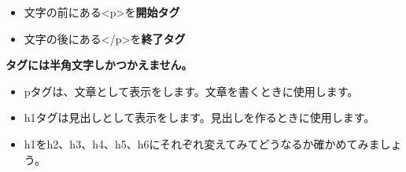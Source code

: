\documentclass[a4paper,12pt]{jarticle}
\begin{document}
\begin{itemize}
  \item 文字の前にある{\textless}p{\textgreater}を\textbf{開始タグ}
  \item 文字の後にある{\textless}/p{\textgreater}を\textbf{終了タグ}
\end{itemize}

\textbf{タグには半角文字しかつかえません。}

\begin{itemize}
  \item pタグは、文章として表示をします。文章を書くときに使用します。

  \item h1タグは見出しとして表示をします。見出しを作るときに使用します。
\end{itemize}


\vfill

\theQuestion\label{Q:hasAnswer04-2}

\begin{itemize}
  \item[]
    h1をh2、h3、h4、h5、h6にそれぞれ変えてみてどうなるか確かめてみましょう。
\end{itemize}

\bigskip
\end{document}
